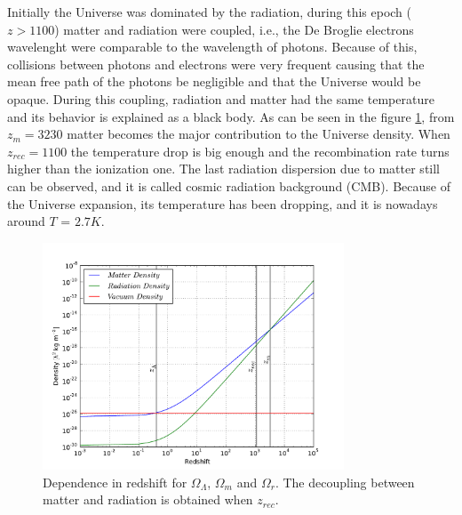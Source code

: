 Initially the Universe was dominated by the radiation, during 
this epoch ($z>1100$) matter and radiation were coupled, i.e., the De Broglie 
electrons wavelenght were comparable to the wavelength of photons. Because
of this, collisions between photons and electrons were very frequent causing
that the mean free path of the photons be negligible and that the Universe 
would be opaque. 
During this coupling, radiation and matter had the same temperature
and its behavior is explained as a black body. 
As can be seen in the figure \ref{densidad}, from $z_m=3230$
matter becomes the major contribution to the Universe density.
When $z_{rec}=1100$ the temperature drop is big enough and the
recombination rate turns higher than the ionization one. 
The last radiation dispersion due to matter still can be
observed, and it is called cosmic radiation background (CMB).
Because of the Universe expansion, its temperature
has been dropping, and it is nowadays around $T$ = $2.7K$. 
  
\begin{figure}[htbp]
       \centering
               \includegraphics[width=0.8\textwidth]{Images/chapter2/density.pdf}
       \caption{ \small Dependence in redshift for $\Omega_\Lambda$, $\Omega_m$ and
       $\Omega_r$. The decoupling between matter and radiation is obtained when 
       $z_{rec}$.
        }
       \label{densidad}
 \end{figure}

